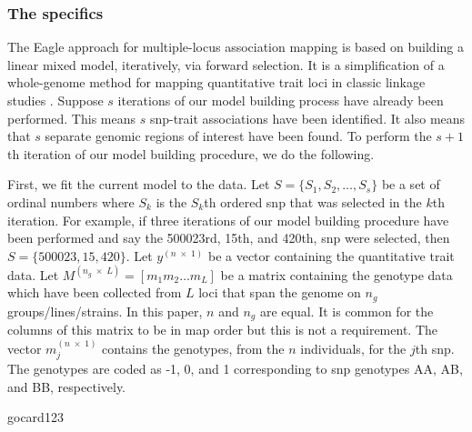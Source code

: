 \documentclass{nature}
\begin{document}
 
 
 

\subsubsection{The specifics}





The Eagle approach for multiple-locus association mapping is based on building a linear mixed model, iteratively, via forward 
selection.  It is a simplification of a whole-genome method for mapping quantitative trait loci in classic linkage studies \cite{verbyla2007analysis}.
Suppose $s$ iterations of our model building process have already been performed. This means $s$ snp-trait 
associations have been identified.  It also means that $s$ separate genomic regions of interest have been found.  
To perform the $s+1$th  iteration of 
our model building procedure, we do the following. 

First, we fit the current model to the data. 
Let $S = \{ S_1, S_2, \ldots, S_s\}$ be a set of ordinal numbers where $S_k$ is the $S_k$th ordered snp that was 
selected in the $k$th iteration. For example, if three iterations of our model building procedure 
have been performed and say the 500023rd, 15th, and 420th, 
snp were selected, then $S=\{500023, 15, 420\}$. 
Let $y^{(n \; \times \;1)}$ be a vector containing the quantitative trait data. 
Let $M^{(n_g \; \times \; L)} = [m_1 m_2 \ldots m_L]$ be a matrix containing the genotype data which have been collected 
from $L$ loci that span the genome on $n_g$ groups/lines/strains.  In this paper, $n$ and $n_g$ are equal. 
 It is common for the columns of this matrix to be in map order but this is not a requirement. 
The vector $m_j^{(n \; \times \; 1)}$ contains the genotypes, from the $n$ individuals,  for the $j$th snp. 
The genotypes are coded as -1, 0, and 1 corresponding to snp genotypes AA, AB, and BB, respectively. 


gocard123
\end{document}
